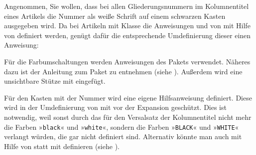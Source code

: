     \begin{Example}
      Angenommen, Sie wollen, dass bei allen Gliederungsnummern im
      Kolumnentitel eines Artikels die Nummer als weiße Schrift auf einem
      schwarzen Kasten ausgegeben wird. Da bei Artikeln mit Klasse
       die Anweisungen %
       und
       von  mit Hilfe von
       definiert werden, genügt dafür die
      entsprechende Umdefinierung dieser einen Anweisung:
      \iffree{}{\enlargethispage{-\baselineskip}\pagebreak}%
      Für die Farbumschaltungen werden Anweisungen des Pakets
       verwendet. Näheres dazu ist der
      Anleitung zum Paket zu entnehmen (siehe \cite{package:xcolor}). 
      \iffalse \par\fi %
      Außerdem wird eine unsichtbare Stütze mit 
      eingefügt.%
      \iffalse Diese Anweisung sollte in keiner ausführlichen
      \LaTeX-Einführung fehlen. \fi %

      Für den Kasten mit der Nummer wird eine eigene Hilfsanweisung
       definiert. Diese wird in der Umdefinierung von
       mit
       vor der
      Expansion geschützt. Dies ist notwendig, weil sonst durch das
       für den Versalsatz der Kolumnentitel
      nicht mehr die Farben »\texttt{black}« und »\texttt{white}«, sondern die
      Farben »\texttt{BLACK}« und »\texttt{WHITE}« verlangt würden, die gar
      nicht definiert sind. Alternativ könnte man  auch mit
      Hilfe von  statt mit 
      definieren (siehe \cite{latex:clsguide}).


\end{Example}
